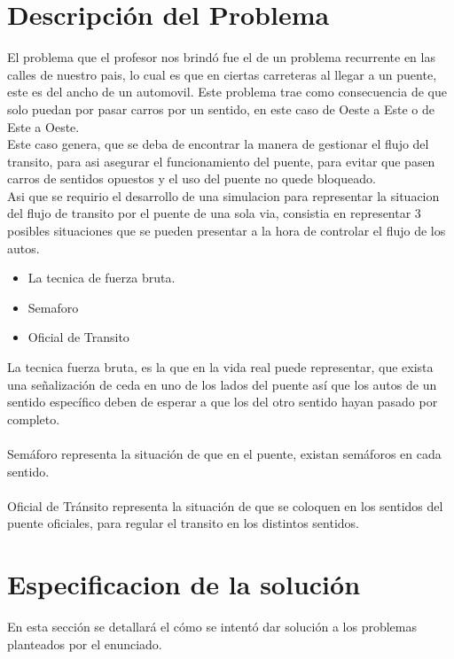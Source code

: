 \documentclass[10pt,a4paper]{article}
\begin{document}
\section{Descripción del Problema}
El problema que el profesor nos brindó fue el de un problema recurrente en las calles de nuestro pais, lo cual es que en ciertas  carreteras al llegar a un puente, este es del ancho de un automovil. Este problema trae como consecuencia de que solo puedan por pasar carros por un sentido, en este caso de Oeste a Este o de Este a Oeste.\\
Este caso genera, que se deba de encontrar la manera de gestionar el flujo del transito, para asi asegurar el funcionamiento del puente, para evitar que pasen carros de sentidos opuestos y el uso del puente no quede bloqueado.\\ 
Asi que se requirio el desarrollo de una simulacion para representar la situacion del flujo de transito por el puente de una sola via, consistia en representar 3 posibles situaciones que se pueden presentar a la hora de controlar el flujo de los autos. 
\begin{itemize}
\item La tecnica de fuerza bruta.
\item Semaforo
\item Oficial de Transito 
\end{itemize}
La tecnica fuerza bruta, es la que en la vida real puede representar, que exista una señalización de ceda en uno de los lados del puente así que los autos de un sentido específico deben de esperar a que los del otro sentido hayan pasado por completo.\\\\
Semáforo representa la situación de que en el puente, existan semáforos en cada sentido.\\\\
Oficial de Tránsito representa la situación de que se coloquen en los sentidos del puente oficiales, para regular el transito en los distintos sentidos.
\section{Especificacion de la solución}
	En esta sección se detallará el cómo se intentó dar solución a los problemas planteados por el enunciado. 
\end{document}
